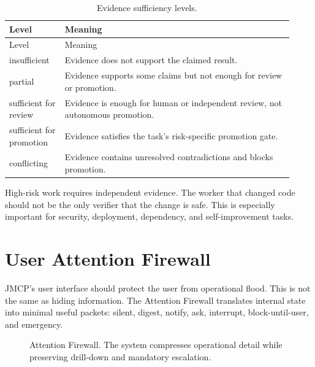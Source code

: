 \documentclass[12pt,journal,onecolumn,draftclsnofoot]{IEEEtran}
\begin{document}
\begin{longtable}{p{0.18\linewidth}p{0.74\linewidth}}
\caption{Evidence sufficiency levels.}\label{tab:evidence}\\
\toprule
Level & Meaning \\
\midrule
\endfirsthead
\toprule
Level & Meaning \\
\midrule
\endhead
insufficient & Evidence does not support the claimed result. \\
partial & Evidence supports some claims but not enough for review or promotion. \\
sufficient for review & Evidence is enough for human or independent review, not autonomous promotion. \\
sufficient for promotion & Evidence satisfies the task's risk-specific promotion gate. \\
conflicting & Evidence contains unresolved contradictions and blocks promotion. \\
\bottomrule
\end{longtable}

High-risk work requires independent evidence. The worker that changed code should not be the only verifier that the change is safe. This is especially important for security, deployment, dependency, and self-improvement tasks.

\section{User Attention Firewall}
JMCP's user interface should protect the user from operational flood. This is not the same as hiding information. The Attention Firewall translates internal state into minimal useful packets: silent, digest, notify, ask, interrupt, block-until-user, and emergency.

\begin{figure}[!ht]
\centering
{}
\caption{Attention Firewall. The system compresses operational detail while preserving drill-down and mandatory escalation.}
\label{fig:attention}
\end{figure}
\end{document}

